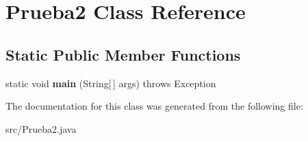 \hypertarget{class_prueba2}{}\section{Prueba2 Class Reference}
\label{class_prueba2}
\subsection*{Static Public Member Functions}
\begin{DoxyCompactItemize}
\item 
\mbox{\label{class_prueba2_aad3b9aecc82daf855b4f3290bb958cf7}} 
static void {\bfseries main} (String\mbox{[}$\,$\mbox{]} args)  throws Exception 
\end{DoxyCompactItemize}


The documentation for this class was generated from the following file\+:\begin{DoxyCompactItemize}
\item 
src/Prueba2.\+java\end{DoxyCompactItemize}
